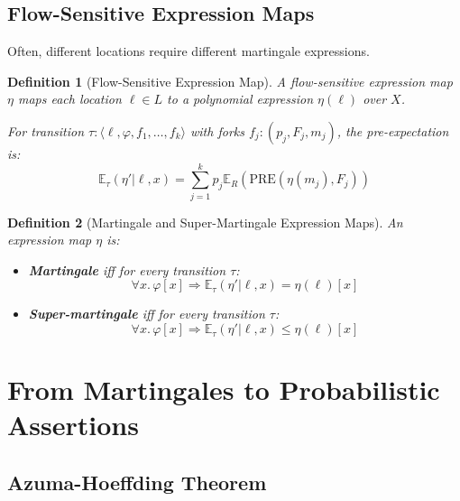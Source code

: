 \documentclass{article}
\newtheorem{definition}{Definition}
\begin{document}
\subsection{Flow-Sensitive Expression Maps}

Often, different locations require different martingale expressions.

\begin{definition}[Flow-Sensitive Expression Map]
A flow-sensitive expression map $\eta$ maps each location $\ell \in L$ to a polynomial expression $\eta(\ell)$ over $X$.

For transition $\tau: \langle \ell, \varphi, f_1, \ldots, f_k \rangle$ with forks $f_j: (p_j, F_j, m_j)$, the pre-expectation is:
\begin{equation}
\mathbb{E}_\tau(\eta' | \ell, x) = \sum_{j=1}^k p_j \mathbb{E}_R(\text{PRE}(\eta(m_j), F_j))
\end{equation}
\end{definition}

\begin{definition}[Martingale and Super-Martingale Expression Maps]
An expression map $\eta$ is:
\begin{itemize}
    \item \textbf{Martingale} iff for every transition $\tau$:
    \begin{equation}
    \forall x. \, \varphi[x] \Rightarrow \mathbb{E}_\tau(\eta' | \ell, x) = \eta(\ell)[x]
    \end{equation}

    \item \textbf{Super-martingale} iff for every transition $\tau$:
    \begin{equation}
    \forall x. \, \varphi[x] \Rightarrow \mathbb{E}_\tau(\eta' | \ell, x) \leq \eta(\ell)[x]
    \end{equation}
\end{itemize}
\end{definition}

\section{From Martingales to Probabilistic Assertions}

\subsection{Azuma-Hoeffding Theorem}
\end{document}
